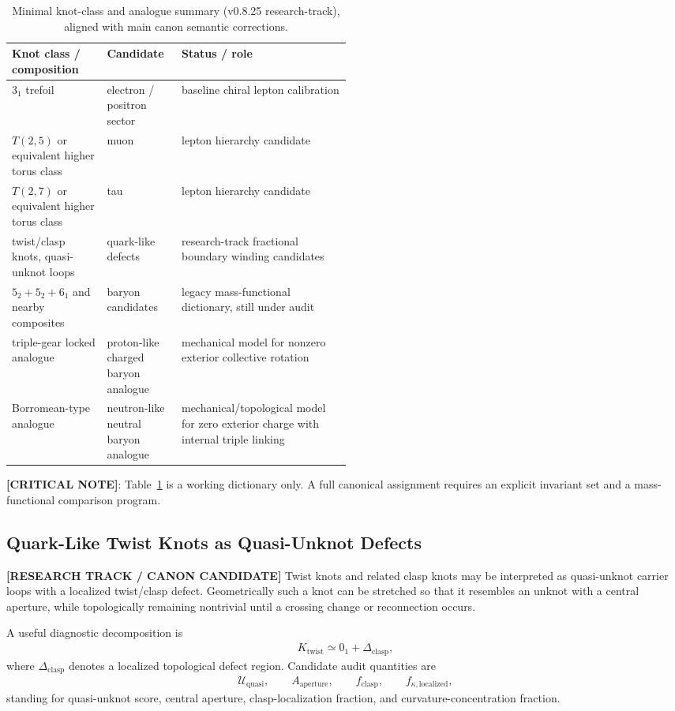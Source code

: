 \begin{table}[h]
\centering
\begin{tabularx}{\linewidth}{p{0.28\linewidth}p{0.22\linewidth}X}
\hline
Knot class / composition & Candidate & Status / role \\
\hline
$3_1$ trefoil & electron / positron sector & baseline chiral lepton calibration \\
$T(2,5)$ or equivalent higher torus class & muon & lepton hierarchy candidate \\
$T(2,7)$ or equivalent higher torus class & tau & lepton hierarchy candidate \\
twist/clasp knots, quasi-unknot loops & quark-like defects & research-track fractional boundary winding candidates \\
$5_2+5_2+6_1$ and nearby composites & baryon candidates & legacy mass-functional dictionary, still under audit \\
triple-gear locked analogue & proton-like charged baryon analogue & mechanical model for nonzero exterior collective rotation \\
Borromean-type analogue & neutron-like neutral baryon analogue & mechanical/topological model for zero exterior charge with internal triple linking \\
\hline
\end{tabularx}
\caption{Minimal knot-class and analogue summary (v0.8.25 research-track), aligned with main canon semantic corrections.}
\label{tab:particle-candidates}
\end{table}

\textbf{[CRITICAL NOTE]}: Table~\ref{tab:particle-candidates} is a working dictionary only. A full canonical assignment requires an explicit invariant set and a mass-functional comparison program.


\subsection{Quark-Like Twist Knots as Quasi-Unknot Defects}
\label{subsec:rt_quark_twist_quasi_unknot}

\textbf{[RESEARCH TRACK / CANON CANDIDATE]} Twist knots and related clasp knots may be interpreted as quasi-unknot carrier loops with a localized twist/clasp defect. Geometrically such a knot can be stretched so that it resembles an unknot with a central aperture, while topologically remaining nontrivial until a crossing change or reconnection occurs.

A useful diagnostic decomposition is
\begin{align}
    K_{\mathrm{twist}}
    \simeq
    0_1 + \Delta_{\mathrm{clasp}},
\end{align}
where $\Delta_{\mathrm{clasp}}$ denotes a localized topological defect region. Candidate audit quantities are
\begin{align}
    \mathcal{U}_{\mathrm{quasi}},\qquad
    A_{\mathrm{aperture}},\qquad
    f_{\mathrm{clasp}},\qquad
    f_{\kappa,\mathrm{localized}},
\end{align}
standing for quasi-unknot score, central aperture, clasp-localization fraction, and curvature-concentration fraction.

